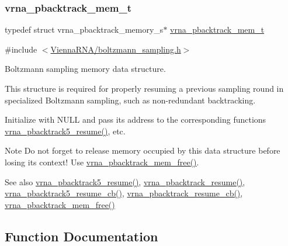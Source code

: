 \subsubsection{\texorpdfstring{vrna\_pbacktrack\_mem\_t}{vrna\_pbacktrack\_mem\_t}}
{\footnotesize\ttfamily typedef struct vrna\+\_\+pbacktrack\+\_\+memory\+\_\+s$\ast$ \mbox{\hyperlink{group__subopt__stochbt_gaa59c30efbed96bf9aaf8005584c72e63}{vrna\+\_\+pbacktrack\+\_\+mem\+\_\+t}}}



{\ttfamily \#include $<$\mbox{\hyperlink{boltzmann__sampling_8h}{Vienna\+R\+N\+A/boltzmann\+\_\+sampling.\+h}}$>$}



Boltzmann sampling memory data structure. 

This structure is required for properly resuming a previous sampling round in specialized Boltzmann sampling, such as non-\/redundant backtracking.

Initialize with {\ttfamily N\+U\+LL} and pass its address to the corresponding functions \mbox{\hyperlink{group__subopt__stochbt_gac5d7065196975b803daeb4e094ba1cb9}{vrna\+\_\+pbacktrack5\+\_\+resume()}}, etc.

\begin{DoxyNote}{Note}
Do not forget to release memory occupied by this data structure before losing its context! Use \mbox{\hyperlink{group__subopt__stochbt_gae64fbdef59e7f503d7e920aac279212b}{vrna\+\_\+pbacktrack\+\_\+mem\+\_\+free()}}.
\end{DoxyNote}
\begin{DoxySeeAlso}{See also}
\mbox{\hyperlink{group__subopt__stochbt_gac5d7065196975b803daeb4e094ba1cb9}{vrna\+\_\+pbacktrack5\+\_\+resume()}}, \mbox{\hyperlink{group__subopt__stochbt_gae175129ece546fe7c092f27072e039d1}{vrna\+\_\+pbacktrack\+\_\+resume()}}, \mbox{\hyperlink{group__subopt__stochbt_ga4a91dc092580faf7799476e8dd76e0ac}{vrna\+\_\+pbacktrack5\+\_\+resume\+\_\+cb()}}, \mbox{\hyperlink{group__subopt__stochbt_ga6fc5ce952995e53baef52cad5581c063}{vrna\+\_\+pbacktrack\+\_\+resume\+\_\+cb()}}, \mbox{\hyperlink{group__subopt__stochbt_gae64fbdef59e7f503d7e920aac279212b}{vrna\+\_\+pbacktrack\+\_\+mem\+\_\+free()}} 
\end{DoxySeeAlso}


\subsection{Function Documentation}
\mbox{\label{group__subopt__stochbt_ga72ebbe45bcbce147a12f27f62b38db78}} 
